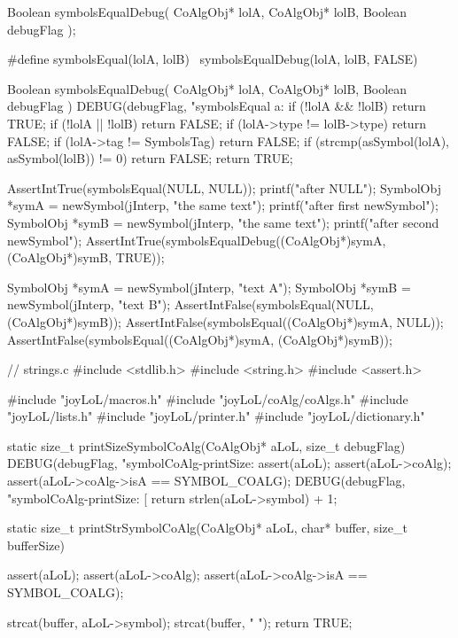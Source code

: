 
\startCHeader
Boolean symbolsEqualDebug(
  CoAlgObj* lolA,
  CoAlgObj* lolB,
  Boolean debugFlag
);

#define symbolsEqual(lolA, lolB) \
  symbolsEqualDebug(lolA, lolB, FALSE)
\stopCHeader

\startCCode
Boolean symbolsEqualDebug(
  CoAlgObj* lolA,
  CoAlgObj* lolB,
  Boolean debugFlag
) {
  DEBUG(debugFlag, "symbolsEqual a:%
  if (!lolA && !lolB) return TRUE;
  if (!lolA || !lolB) return FALSE;
  if (lolA->type != lolB->type) return FALSE;
  if (lolA->tag != SymbolsTag) return FALSE;
  if (strcmp(asSymbol(lolA), asSymbol(lolB)) != 0) return FALSE;
  return TRUE;
}
\stopCCode


\startCTest
  AssertIntTrue(symbolsEqual(NULL, NULL));
  printf("after NULL\n");
  SymbolObj *symA = newSymbol(jInterp, "the same text");
  printf("after first newSymbol\n");
  SymbolObj *symB = newSymbol(jInterp, "the same text");
  printf("after second newSymbol\n");
  AssertIntTrue(symbolsEqualDebug((CoAlgObj*)symA, (CoAlgObj*)symB, TRUE));
\stopCTest
\stopTestCase


\startCTest
  SymbolObj *symA = newSymbol(jInterp, "text A");
  SymbolObj *symB = newSymbol(jInterp, "text B");
  AssertIntFalse(symbolsEqual(NULL, (CoAlgObj*)symB));
  AssertIntFalse(symbolsEqual((CoAlgObj*)symA, NULL));
  AssertIntFalse(symbolsEqual((CoAlgObj*)symA, (CoAlgObj*)symB));
\stopCTest
\stopTestCase
\stopTestSuite

\starttyping
// strings.c
#include <stdlib.h>
#include <string.h>
#include <assert.h>

#include "joyLoL/macros.h"
#include "joyLoL/coAlg/coAlgs.h"
#include "joyLoL/lists.h"
#include "joyLoL/printer.h"
#include "joyLoL/dictionary.h"

static size_t printSizeSymbolCoAlg(CoAlgObj* aLoL, size_t debugFlag) {
  DEBUG(debugFlag, "symbolCoAlg-printSize: %
  assert(aLoL);
  assert(aLoL->coAlg);
  assert(aLoL->coAlg->isA == SYMBOL_COALG);
  DEBUG(debugFlag, "symbolCoAlg-printSize: [%
  return strlen(aLoL->symbol) + 1;
}

static size_t printStrSymbolCoAlg(CoAlgObj* aLoL,
                                  char* buffer, size_t bufferSize) {
  assert(aLoL);
  assert(aLoL->coAlg);
  assert(aLoL->coAlg->isA == SYMBOL_COALG);

  strcat(buffer, aLoL->symbol);
  strcat(buffer, " ");
  return TRUE;
}
\stoptyping

